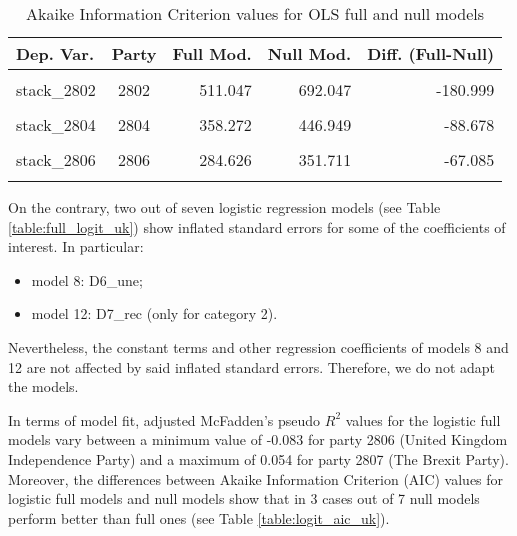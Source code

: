 \documentclass[
]{article}
\providecommand{\tightlist}{%
  \setlength{\itemsep}{0pt}\setlength{\parskip}{0pt}}
\begin{document}
\begin{table}[!h]

\caption{\label{tab:unnamed-chunk-181}Akaike Information Criterion values for OLS full and null models 
        \label{table:ols_aic_uk}}
\centering
\begin{tabular}[t]{lcrrr}
\toprule
Dep. Var. & Party & Full Mod. & Null Mod. & Diff. (Full-Null)\\
\midrule
\cellcolor{gray!6}{stack\_2801} & \cellcolor{gray!6}{2801} & \cellcolor{gray!6}{608.974} & \cellcolor{gray!6}{701.857} & \cellcolor{gray!6}{-92.883}\\
stack\_2802 & 2802 & 511.047 & 692.047 & -180.999\\
\cellcolor{gray!6}{stack\_2803} & \cellcolor{gray!6}{2803} & \cellcolor{gray!6}{501.942} & \cellcolor{gray!6}{556.253} & \cellcolor{gray!6}{-54.311}\\
stack\_2804 & 2804 & 358.272 & 446.949 & -88.678\\
\cellcolor{gray!6}{stack\_2805} & \cellcolor{gray!6}{2805} & \cellcolor{gray!6}{40.646} & \cellcolor{gray!6}{246.372} & \cellcolor{gray!6}{-205.726}\\
\addlinespace
stack\_2806 & 2806 & 284.626 & 351.711 & -67.085\\
\cellcolor{gray!6}{stack\_2807} & \cellcolor{gray!6}{2807} & \cellcolor{gray!6}{738.940} & \cellcolor{gray!6}{756.590} & \cellcolor{gray!6}{-17.650}\\
\bottomrule
\end{tabular}
\end{table}

On the contrary, two out of seven logistic regression models (see Table \ref{table:full_logit_uk}) show inflated standard errors for some of the coefficients of interest. In particular:

\begin{itemize}
\tightlist
\item
  model 8: D6\_une;
\item
  model 12: D7\_rec (only for category 2).
\end{itemize}

Nevertheless, the constant terms and other regression coefficients of models 8 and 12 are not affected by said inflated standard errors. Therefore, we do not adapt the models.

In terms of model fit, adjusted McFadden's pseudo \(R^2\) values for the logistic full models vary between
a minimum value of
-0.083
for party 2806
(United Kingdom Independence Party)
and a maximum of
0.054
for party 2807
(The Brexit Party).
Moreover, the differences between Akaike Information Criterion (AIC) values for logistic full models and null models show that in 3 cases out of 7 null models perform better than full ones (see Table \ref{table:logit_aic_uk}).
\end{document}
